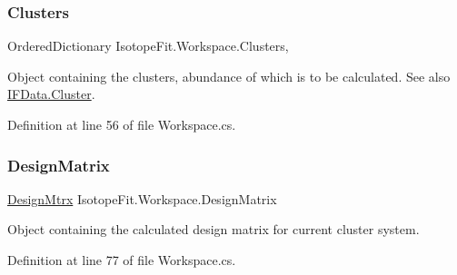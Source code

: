 \mbox{\label{class_isotope_fit_1_1_workspace_a13958fbe0adace21990cb1eabbd421e9}} 
\subsubsection{\texorpdfstring{Clusters}{Clusters}}
{\footnotesize\ttfamily Ordered\+Dictionary Isotope\+Fit.\+Workspace.\+Clusters\hspace{0.3cm}{\ttfamily [get]}, {\ttfamily [set]}}



Object containing the clusters, abundance of which is to be calculated. See also \hyperlink{class_isotope_fit_1_1_i_f_data_1_1_cluster}{I\+F\+Data.\+Cluster}. 



Definition at line 56 of file Workspace.\+cs.

\mbox{\label{class_isotope_fit_1_1_workspace_ae24a2ee8f965fb2ed7ad3a592163271d}} 
\subsubsection{\texorpdfstring{Design\+Matrix}{DesignMatrix}}
{\footnotesize\ttfamily \hyperlink{class_isotope_fit_1_1_workspace_1_1_design_mtrx}{Design\+Mtrx} Isotope\+Fit.\+Workspace.\+Design\+Matrix\hspace{0.3cm}{\ttfamily [get]}}



Object containing the calculated design matrix for current cluster system. 



Definition at line 77 of file Workspace.\+cs.

\mbox{\label{class_isotope_fit_1_1_workspace_a1d6cc2dd07cbfe920da9f1bffc9b32c2}} 
